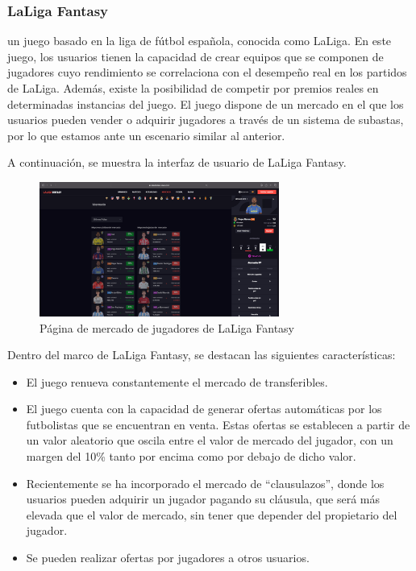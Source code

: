 \subsubsection{LaLiga Fantasy}
 un juego basado en la liga de fútbol española, conocida como LaLiga. En este juego, los usuarios tienen la capacidad de crear equipos que se componen de jugadores cuyo rendimiento se correlaciona con el desempeño real en los partidos de LaLiga. Además, existe la posibilidad de competir por premios reales en determinadas instancias del juego.
El juego dispone de un mercado en el que los usuarios pueden vender o adquirir jugadores a través de un sistema de subastas, por lo que estamos ante un escenario similar al anterior.

A continuación, se muestra la interfaz de usuario de LaLiga Fantasy.
\begin{figure}[H]
    \centering
    \includegraphics[width=0.7\textwidth]{figures/4-Estudio-viabilidad/4_LaLigaFantasy.png}
    \caption{Página de mercado de jugadores de LaLiga Fantasy}
    \label{fig:la_liga_fantasy}
    \hypertarget{fig:la_liga_fantasy}{}
\end{figure}

Dentro del marco de LaLiga Fantasy, se destacan las siguientes características:
\begin{itemize}
    \item El juego renueva constantemente el mercado de transferibles.
    \item El juego cuenta con la capacidad de generar ofertas automáticas por los futbolistas que se encuentran en venta. Estas ofertas se establecen a partir de un valor aleatorio que oscila entre el valor de mercado del jugador, con un margen del 10\% tanto por encima como por debajo de dicho valor.
    \item Recientemente se ha incorporado el mercado de ``clausulazos'', donde los usuarios pueden adquirir un jugador pagando su cláusula, que será más elevada que el valor de mercado, sin tener que depender del propietario del jugador.
    \item Se pueden realizar ofertas por jugadores a otros usuarios.
\end{itemize}

